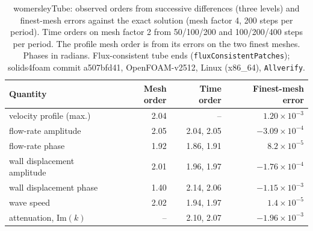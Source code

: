 \begin{table}[htbp]
	\centering
	\small
	\setlength{\tabcolsep}{4pt}
	\caption{womersleyTube: observed orders from successive differences (three levels) and finest-mesh errors against the exact solution (mesh factor 4, 200 steps per period). Time orders on mesh factor 2 from 50/100/200 and 100/200/400 steps per period. The profile mesh order is from its errors on the two finest meshes. Phases in radians. Flux-consistent tube ends (\texttt{fluxConsistentPatches}); solids4foam commit a507bfd41, OpenFOAM-v2512, Linux (x86\_64), \texttt{Allverify}.}
	\label{tab:womersley}
	\begin{tabular}{lrrr}
		\toprule
		Quantity & Mesh order & Time order & Finest-mesh error \\
		\midrule
		velocity profile (max.) & 2.04 & -- & $1.20\times10^{-3}$ \\
		flow-rate amplitude & 2.05 & 2.04, 2.05 & $-3.09\times10^{-4}$ \\
		flow-rate phase & 1.92 & 1.86, 1.91 & $8.2\times10^{-5}$ \\
		wall displacement amplitude & 2.01 & 1.96, 1.97 & $-1.76\times10^{-4}$ \\
		wall displacement phase & 1.40 & 2.14, 2.06 & $-1.15\times10^{-3}$ \\
		wave speed & 2.02 & 1.94, 1.97 & $1.4\times10^{-5}$ \\
		attenuation, $\mathrm{Im}(k)$ & -- & 2.10, 2.07 & $-1.96\times10^{-3}$ \\
		\bottomrule
	\end{tabular}
\end{table}


